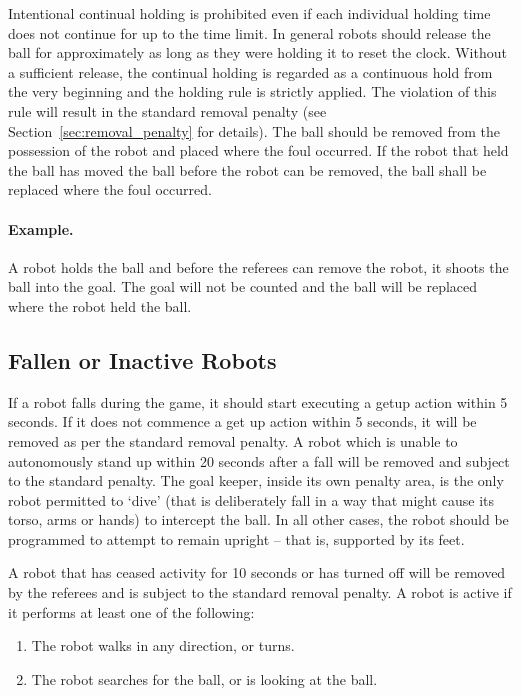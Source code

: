 \documentclass[12pt]{article}
\begin{document}
Intentional continual holding is prohibited even if each individual holding time does not continue for up to the time limit. In general robots should release the ball for approximately as long as they were holding it to reset the clock. Without a sufficient release, the continual holding is regarded as a continuous hold from the very beginning and the holding rule is strictly applied. The violation of this rule will result in the standard removal penalty (see Section~\ref{sec:removal_penalty} for details). The ball should be removed from the possession of the robot and placed where the foul occurred. If the robot that held the ball has moved the ball before the robot can be removed, the ball shall be replaced where the foul occurred.

\paragraph{Example.} A robot holds the ball and before the referees
can remove the robot, it shoots the ball into the goal. The goal
will not be counted and the ball will be replaced where the robot
held the ball.

\subsection{Fallen or Inactive Robots}
\label{sec:fallenrobots}

If a robot falls during the game, it should start executing a getup action within 5 seconds. If it does not commence a get up action within 5 seconds, it will be removed as per the standard removal penalty. A robot which is unable to autonomously stand up within 20 seconds after a fall will be removed and subject to the standard penalty. The goal keeper, inside its own penalty area, is the only robot permitted to `dive' (that is deliberately fall in a way that might cause its torso, arms or hands) to intercept the ball. In all other cases, the robot should be programmed to attempt to remain upright -- that is, supported by its feet.

A robot that has ceased activity for 10 seconds or has turned off will be removed by the referees and is subject to the standard removal penalty. A robot is active if it performs at least one of the following:

\begin{enumerate}

\item The robot walks in any direction, or turns.

\item The robot searches for the ball, or is looking at the ball.

\end{enumerate}
\end{document}
